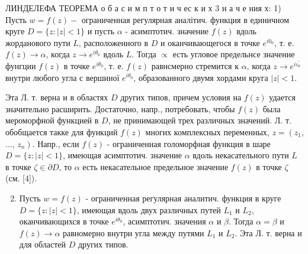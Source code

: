 \documentclass[10pt]{article}
\begin{document}
ЛИНДЕЛЕФА ТЕОРЕМА о б а с и м п т о т и ч ес к и х 3 н а ч е ния х: 1) Пусть $w=f(z)-$ ограниченная регулярная аналітич. функция в единичном круге $D=\{z:|z|<1\}$ и пусть $\alpha$ - асимптотич. значение $f(z)$ вдоль жорданового пути $L$, расположенного в $D$ и оканчивающегося в точке $e^{i 0_{0}}$, т. е. $f(z) \rightarrow \alpha$, когда $z \rightarrow e^{i \theta_{0}}$ вдоль $L$. Тогда $\propto$ есть угловое предельнсе значение фунгции $f(z)$ в точке $e^{i \dot{\theta}_{0}}$, т. е. $f(z)$ равнсмерно стремится к $\alpha$, когда $z \rightarrow e^{i \iota_{0}^{\prime}}$ внутри любого угла с вершиної $e^{i \theta_{0}}$, образованного двумя хордами круга $|z|<1$.



Эта Л. т. верна и в областях $D$ других типов, причем условия на $f(z)$ удается значительно расширить. Достаточно, напр., потребовать, чтобы $f(z)$ была мероморфной функцией в $D$, не принимающей трех различных значений. Л. т. обобщается такке для функций $f(z)$ многих комплексных переменных, $z=\left(z_{1}\right.$, ..., $\left.z_{n}\right)$. Напр., если $f(z)$ - ограниченная голоморфная функция в шаре $D=\{z:|z|<1\}$, имеющая асимптотич. значение $\alpha$ вдоль некасательного пути $L$ в точке $\zeta \in \partial D$, то $\alpha$ есть некасательное предельное значение $f(z)$ в точке $\zeta$ (см. [4]).



\begin{enumerate}

  \setcounter{enumi}{1}

  \item Пусть $w=f(z)$ - ограниченная регулярная аналитич. функция в круге $D=\{z:|z|<1\}$, имеющая вдоль двух различных путей $L_{1}$ и $L_{2}$, оканчивающихся в точке $e^{i \theta_{0}}$, асимптотич. значения $\alpha$ и $\beta$. Тогда $\alpha=\beta$ и $f(z) \rightarrow \alpha$ равномерно внутри угла между путями $L_{1}$ и $L_{2}$. Эта Л. т. верна и для областей $D$ других типов.

\end{enumerate}
\end{document}

